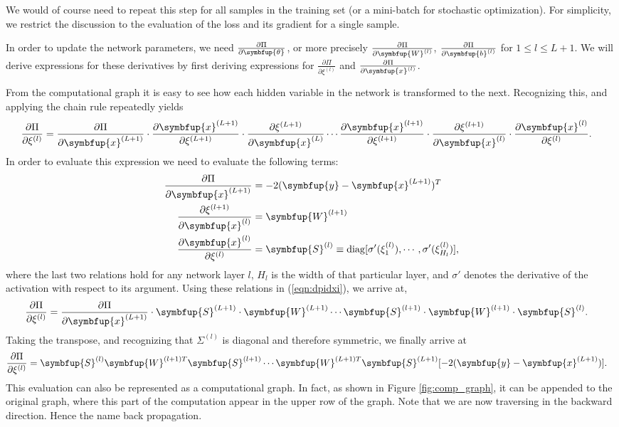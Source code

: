 \documentclass[11pt]{extarticle}
\newcommand{\vx}{\symbfup{x}}
\newcommand{\vb}{\symbfup{b}}
\newcommand{\vy}{\symbfup{y}}
\newcommand{\vW}{\symbfup{W}}
\theoremstyle{definition}
\newcommand{\btheta}{\symbfup{\theta}}
\newcommand{\df}[2]{\frac{\partial #1}{\partial #2}}
\begin{document}
We would of course need to repeat this step for all samples in the training set (or a mini-batch for stochastic optimization). For simplicity, we restrict the discussion to the evaluation of the loss and its gradient for a single sample.

In order to update the network parameters, we need $\df{\Pi}{\btheta}$, or more precisely $\df{\Pi}{\vW^{(l)}}$, $\df{\Pi}{\vb^{(l)}}$ for $1\leqslant l \leqslant {L+1}$. We will derive expressions for these derivatives by first deriving expressions for $\df{\Pi}{\xi^{(l)}}$ and $\df{\Pi}{\vx^{(l)}}$. 

From the computational graph it is easy to see how each hidden variable in the network is transformed to the next. Recognizing this, and applying the chain rule repeatedly yields
\begin{align}
  \df{\Pi}{\xi^{(l)}} &=  \label{eqn:dpidxi} \df{\Pi}{\vx^{(L+1)}} \cdot \df{\vx^{(L+1)}}{\xi^{(L+1)}} \cdot \df{\xi^{(L+1)}}{\vx^{(L)}} \cdots \df{\vx^{(l+1)}}{\xi^{(l+1)}} \cdot \df{\xi^{(l+1)}}{\vx^{(l)}} \cdot \df{\vx^{(l)}}{\xi^{(l)}}. 
\end{align}
In order to evaluate this expression we need to evaluate the following terms:
\begin{align}
  \df{\Pi}{\vx^{(L+1)}} &= -2 (\vy-\vx^{(L+1)})^T  \\
  \df{\xi^{(l+1)}}{\vx^{(l)}} &= \vW^{(l+1)}\\
  \df{\vx^{(l)}}{\xi^{(l)}} &= \symbfup{S}^{(l)} \equiv {\rm diag}[\sigma'(\xi^{(l)}_1), \cdots, \sigma'(\xi^{(l)}_{H_l})],
\end{align}
where the last two relations hold for any network layer $l$, $H_l$ is the width of that particular layer, and $\sigma'$ denotes the derivative of the activation with respect to its argument. Using these relations in (\ref{eqn:dpidxi}), we arrive at,
\begin{align}
  \df{\Pi}{\xi^{(l)}} &= \label{eqn:dpidxi1} \df{\Pi}{\vx^{(L+1)}} \cdot \symbfup{S}^{(L+1)} \cdot \vW^{(L+1)} \cdots \symbfup{S}^{(l+1)} \cdot \vW^{(l+1)} \cdot \symbfup{S}^{(l)}. 
\end{align}
Taking the transpose, and recognizing that $\Sigma^{(l)}$ is diagonal and therefore symmetric, we finally arrive at
\begin{align}
  \df{\Pi}{\xi^{(l)}} &= \label{eqn:dpidxifinal} \symbfup{S}^{(l)} \vW^{(l+1)T} \symbfup{S}^{(l+1)} \cdots   \vW^{(L+1)T} \symbfup{S}^{(L+1)} [-2 (\vy-\vx^{(L+1)})]. 
\end{align}
This evaluation can also be represented as a computational graph. In fact, as shown in Figure \ref{fig:comp_graph}, it can be appended to the original graph, where this part of the computation appear in the upper row of the graph. Note that we are now traversing in the backward direction.  Hence the name back propagation. 
\end{document}
